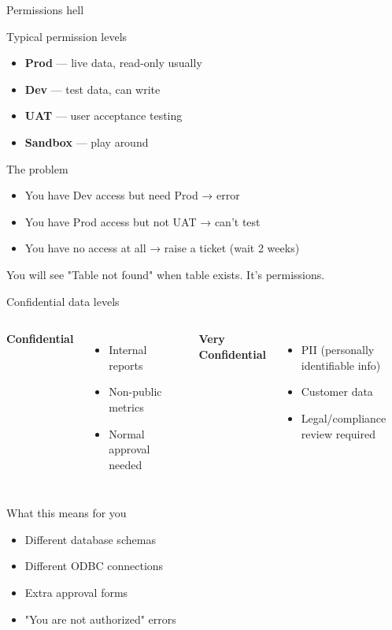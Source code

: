 \documentclass[aspectratio=169, 11pt]{beamer}
\begin{document}
	\begin{frame}{Permissions hell}
		\begin{block}{Typical permission levels}
			\tiny
			\begin{itemize}
				\item \textbf{Prod} — live data, read-only usually
				\item \textbf{Dev} — test data, can write
				\item \textbf{UAT} — user acceptance testing
				\item \textbf{Sandbox} — play around
			\end{itemize}
		\end{block}
		\vspace{0.03cm}
		\begin{block}{The problem}
			\tiny
			\begin{itemize}
				\item You have Dev access but need Prod → error
				\item You have Prod access but not UAT → can't test
				\item You have no access at all → raise a ticket (wait 2 weeks)
			\end{itemize}
		\end{block}
		\tiny\alert{You will see "Table not found" when table exists. It's permissions.}
	\end{frame}
	
	\begin{frame}{Confidential data levels}
		\tiny
		\begin{columns}[T]
			\textbf{Confidential}
			\begin{itemize}
				\item Internal reports
				\item Non-public metrics
				\item Normal approval needed
			\end{itemize}
			\textbf{Very Confidential}
			\begin{itemize}
				\item PII (personally identifiable info)
				\item Customer data
				\item Legal/compliance review required
			\end{itemize}
		\end{columns}
		\vspace{0.1cm}
		\begin{block}{What this means for you}
			\tiny
			\begin{itemize}
				\item Different database schemas
				\item Different ODBC connections
				\item Extra approval forms
				\item "You are not authorized" errors
			\end{itemize}
		\end{block}
	\end{frame}
	
\end{document}
